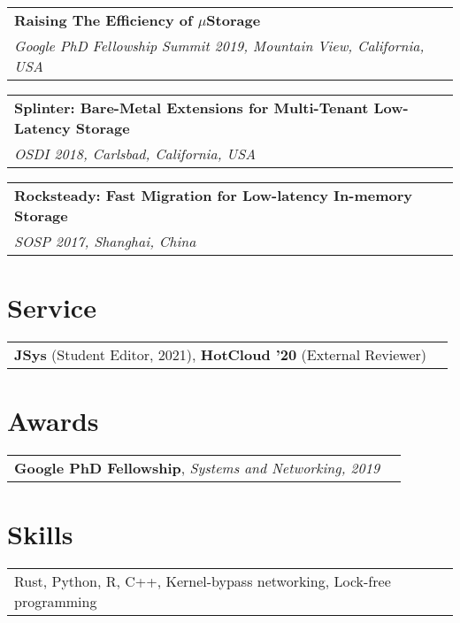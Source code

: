 \documentclass[margin,line]{res}
\begin{document}
\begin{resume}
\vspace{-7pt}
\begin{tabular}{@{}p{5.5in}p{4in}}
{\bf Raising The Efficiency of $\mu$Storage}\\
{\small\em Google PhD Fellowship Summit 2019, Mountain View, California,
USA}\\
\end{tabular}

\vspace{-7pt}
\begin{tabular}{@{}p{5.5in}p{4in}}
{\bf Splinter: Bare-Metal Extensions for Multi-Tenant Low-Latency Storage}\\
{\small\em OSDI 2018, Carlsbad, California, USA}\\
\end{tabular}

\vspace{-7pt}
\begin{tabular}{@{}p{5.5in}p{4in}}
{\bf Rocksteady: Fast Migration for Low-latency In-memory Storage}\\
{\small\em SOSP 2017, Shanghai, China}\\
\end{tabular}

\section{\sc Service}
\begin{tabular}{@{}p{5.5in}p{4in}}
{\bf JSys} {\small (Student Editor, 2021)}, {\bf HotCloud '20} {\small
(External Reviewer)}\\
\end{tabular}

\section{\sc Awards}
\begin{tabular}{@{}p{5.5in}p{4in}}
{\bf Google PhD Fellowship}, {\small\em Systems and Networking, 2019}\\
\end{tabular}

\section{\sc Skills}
\begin{tabular}{@{}p{5.5in}p{4in}}
Rust, Python, R, C++, Kernel-bypass networking, Lock-free programming
\end{tabular}

\end{resume}
\end{document}
